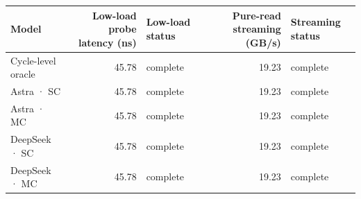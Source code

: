\begin{tabular}{lrlrl}
\toprule
Model & Low-load probe latency (ns) & Low-load status & Pure-read streaming (GB/s) & Streaming status \\
\midrule
Cycle-level oracle & 45.78 & complete & 19.23 & complete \\
Astra · SC & 45.78 & complete & 19.23 & complete \\
Astra · MC & 45.78 & complete & 19.23 & complete \\
DeepSeek · SC & 45.78 & complete & 19.23 & complete \\
DeepSeek · MC & 45.78 & complete & 19.23 & complete \\
\bottomrule
\end{tabular}
